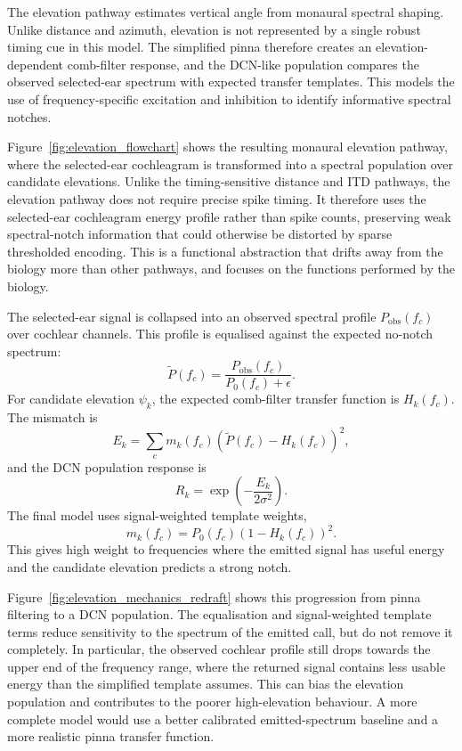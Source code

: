 

The elevation pathway estimates vertical angle from monaural spectral shaping. Unlike distance and azimuth, elevation is not represented by a single robust timing cue in this model. The simplified pinna therefore creates an elevation-dependent comb-filter response, and the DCN-like population compares the observed selected-ear spectrum with expected transfer templates. This models the use of frequency-specific excitation and inhibition to identify informative spectral notches.

Figure~\ref{fig:elevation_flowchart} shows the resulting monaural elevation pathway, where the selected-ear cochleagram is transformed into a spectral population over candidate elevations. Unlike the timing-sensitive distance and ITD pathways, the elevation pathway does not require precise spike timing. It therefore uses the selected-ear cochleagram energy profile rather than spike counts, preserving weak spectral-notch information that could otherwise be distorted by sparse thresholded encoding. This is a functional abstraction that drifts away from the biology more than other pathways, and focuses on the functions performed by the biology.

The selected-ear signal is collapsed into an observed spectral profile $P_{\mathrm{obs}}(f_c)$ over cochlear channels. This profile is equalised against the expected no-notch spectrum:
\begin{equation}
    \tilde{P}(f_c)
    =
    \frac{P_{\mathrm{obs}}(f_c)}{P_0(f_c)+\epsilon}.
\end{equation}
For candidate elevation $\psi_k$, the expected comb-filter transfer function is $H_k(f_c)$. The mismatch is
\begin{equation}
    E_k
    =
    \sum_c
    m_k(f_c)
    \left(\tilde{P}(f_c)-H_k(f_c)\right)^2,
\end{equation}
and the DCN population response is
\begin{equation}
    R_k
    =
    \exp\left(-\frac{E_k}{2\sigma^2}\right).
\end{equation}
The final model uses signal-weighted template weights,
\begin{equation}
    m_k(f_c)=P_0(f_c)(1-H_k(f_c))^2.
\end{equation}
This gives high weight to frequencies where the emitted signal has useful energy and the candidate elevation predicts a strong notch.

Figure~\ref{fig:elevation_mechanics_redraft} shows this progression from pinna filtering to a DCN population. The equalisation and signal-weighted template terms reduce sensitivity to the spectrum of the emitted call, but do not remove it completely. In particular, the observed cochlear profile still drops towards the upper end of the frequency range, where the returned signal contains less usable energy than the simplified template assumes. This can bias the elevation population and contributes to the poorer high-elevation behaviour. A more complete model would use a better calibrated emitted-spectrum baseline and a more realistic pinna transfer function.

